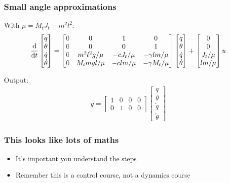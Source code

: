 \documentclass{beamer-control}
\begin{document}
\begin{frame}
\frametitle{Small angle approximations}
With $\mu = M_tJ_t - m^2l^2$:
\begin{equation}
\frac{\mathrm{d} }{\mathrm{d} t}
\begin{bmatrix}
q \\
\theta \\
\dot{q} \\
\dot{\theta}
\end{bmatrix}
=
\begin{bmatrix}
0 & 0 & 1 & 0 \\
0 & 0 & 0 & 1 \\
0 & m^2 l^2 g / \mu & -c J_t / \mu & -\gamma l m / \mu \\
0 & M_t m g l / \mu & -c l m / \mu & -\gamma M_t / \mu
\end{bmatrix}
\begin{bmatrix}
q \\
\theta \\
\dot{q} \\
\dot{\theta}
\end{bmatrix}
+
\begin{bmatrix}
0 \\
0 \\
J_t / \mu \\
l m / \mu
\end{bmatrix}
u
\end{equation}

Output:
\begin{align}
y = \begin{bmatrix}
1 & 0 & 0 & 0\\
0 & 1 & 0 & 0
\end{bmatrix}
\begin{bmatrix}
q \\
\theta \\
\dot{q} \\
\dot{\theta}
\end{bmatrix}
\end{align}
\end{frame}

\begin{frame}
\frametitle{This looks like lots of maths}
\begin{itemize}
\item It's important you understand the steps
\item Remember this is a control course, not a dynamics course
\end{itemize}
\end{frame}
\end{document}
